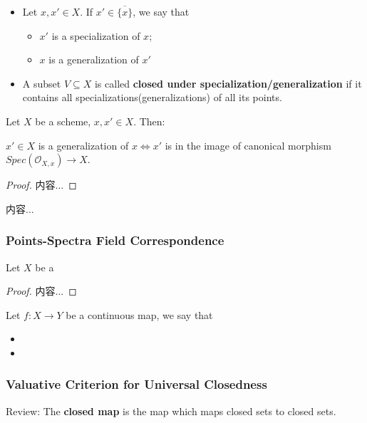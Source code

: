 \documentclass[Total.tex]{subfiles}
\begin{document}
			\begin{Def}
				\begin{itemize}
					\item Let $x,x'\in X$. If $x'\in \overline{\{x\}}$, we say that 
					
					\begin{itemize}
						\item $x'$ is a specialization of $x$;
						\item $x$ is a generalization of $x'$
					\end{itemize}
					\item A subset $V\subseteq X$ is called \textbf{closed under specialization/generalization} if it contains all specializations(generalizations) of all its points.
 				\end{itemize}
			\end{Def}
			
			\begin{lemma}
				Let $X$ be a scheme, $x,x'\in X$. Then:
				\begin{center}
					$x'\in X$ is a generalization of $x\Leftrightarrow x'$ is in the image of canonical morphism $Spec(\mathcal{O}_{X,x})\rightarrow X$. 
				\end{center}
			\end{lemma}
			\begin{proof}
				内容...
			\end{proof}
			
			\begin{example}
				内容...
			\end{example}
			\subsubsection{Points-Spectra Field Correspondence}
			\begin{lemma}
				Let $X$ be a 
			\end{lemma}
			\begin{proof}
				内容...
			\end{proof}
			
			\begin{Def}
				Let $f:X\rightarrow Y$ be a continuous map, we say that
				
				\begin{itemize}
					\item 
					\item 
				\end{itemize}
			\end{Def}
			\subsubsection{Valuative Criterion for Universal Closedness}
			Review: The \textbf{closed map} is the map which maps closed sets to closed sets.
			\begin{Def}
				
			\end{Def}
			
\end{document}
